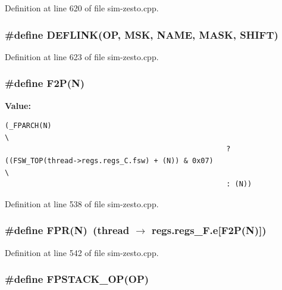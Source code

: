 Definition at line 620 of file sim-zesto.cpp.
\subsubsection[{DEFLINK}]{\setlength{\rightskip}{0pt plus 5cm}\#define DEFLINK(OP, \/  MSK, \/  NAME, \/  MASK, \/  SHIFT)}\label{sim-zesto_8cpp_e2e57a47696d1134596738df09c2a5f2}




Definition at line 623 of file sim-zesto.cpp.
\subsubsection[{F2P}]{\setlength{\rightskip}{0pt plus 5cm}\#define F2P(N)}\label{sim-zesto_8cpp_9adbd7a2d18e1ad0c7ae0fe923acad93}


\textbf{Value:}

\begin{Code}\begin{verbatim}(_FPARCH(N)                                                             \
                                                    ? ((FSW_TOP(thread->regs.regs_C.fsw) + (N)) & 0x07)                         \
                                                    : (N))
\end{verbatim}
\end{Code}


Definition at line 538 of file sim-zesto.cpp.
\subsubsection[{FPR}]{\setlength{\rightskip}{0pt plus 5cm}\#define FPR(N)~(thread $\rightarrow$ regs.regs\_\-F.e[F2P(N)])}\label{sim-zesto_8cpp_fcb75f93887802ec859d1129462e2bc7}




Definition at line 542 of file sim-zesto.cpp.
\subsubsection[{FPSTACK\_\-OP}]{\setlength{\rightskip}{0pt plus 5cm}\#define FPSTACK\_\-OP(OP)}\label{sim-zesto_8cpp_bdcf3cd4e8e60b7a1219db98c857cef9}


